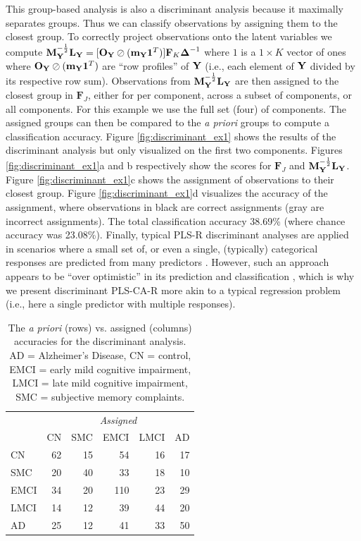 \documentclass[12pt]{article}
\begin{document}
This group-based analysis is also a discriminant analysis because it
maximally separates groups. Thus we can classify observations by
assigning them to the closest group. To correctly project observations
onto the latent variables we compute
\({\bf M}_{\bf Y}^{-\frac{1}{2}}{\mathbf L}_{\mathbf Y} = [{\bf O}_{\bf Y} \oslash ({\bf m}_{\bf Y}{\bf 1}^T)]{\bf F}_{K}\boldsymbol{\Delta}^{-1}\)
where \(1\) is a \(1 \times K\) vector of ones where
\({\bf O}_{\bf Y} \oslash ({\bf m}_{\bf Y}{\bf 1}^T)\) are ``row
profiles'' of \({\bf Y}\) (i.e., each element of \({\bf Y}\) divided by
its respective row sum). Observations from
\({\bf M}_{\bf Y}^{-\frac{1}{2}}{\mathbf L}_{\mathbf Y}\) are then
assigned to the closest group in \({\mathbf F}_{J}\), either for per
component, across a subset of components, or all components. For this
example we use the full set (four) of components. The assigned groups
can then be compared to the \emph{a priori} groups to compute a
classification accuracy. Figure \ref{fig:discriminant_ex1} shows the
results of the discriminant analysis but only visualized on the first
two components. Figures \ref{fig:discriminant_ex1}a and b respectively
show the scores for \({\mathbf F}_{J}\) and
\({\bf M}_{\bf Y}^{-\frac{1}{2}}{\mathbf L}_{\mathbf Y}\). Figure
\ref{fig:discriminant_ex1}c shows the assignment of observations to
their closest group. Figure \ref{fig:discriminant_ex1}d visualizes the
accuracy of the assignment, where observations in black are correct
assignments (gray are incorrect assignments). The total classification
accuracy 38.69\% (where chance accuracy was 23.08\%). Finally, typical
PLS-R discriminant analyses are applied in scenarios where a small set
of, or even a single, (typically) categorical responses are predicted
from many predictors \citep{perez-enciso_prediction_2003}. However, such
an approach appears to be ``over optimistic'' in its prediction and
classification \citep{rodriguez-perez_overoptimism_2018}, which is why
we present discriminant PLS-CA-R more akin to a typical regression
problem (i.e., here a single predictor with multiple responses).

\begin{table}[!h]

\caption{\label{tab:unnamed-chunk-7}\label{table:assign_ex1} The \textit{a priori} (rows) vs. assigned (columns) accuracies for the discriminant analysis. AD = Alzheimer's Disease, CN = control, EMCI = early mild cognitive impairment, LMCI = late mild cognitive impairment, SMC = subjective memory complaints.}
\centering
\begin{tabular}[t]{lrrrrr}
\toprule
\multicolumn{1}{c}{\em  } & \multicolumn{5}{c}{\em Assigned} \\
\cmidrule(l{2pt}r{2pt}){2-6}
  & CN & SMC & EMCI & LMCI & AD\\
\midrule
CN & 62 & 15 & 54 & 16 & 17\\
SMC & 20 & 40 & 33 & 18 & 10\\
EMCI & 34 & 20 & 110 & 23 & 29\\
LMCI & 14 & 12 & 39 & 44 & 20\\
AD & 25 & 12 & 41 & 33 & 50\\
\bottomrule
\end{tabular}
\end{table}
\end{document}
